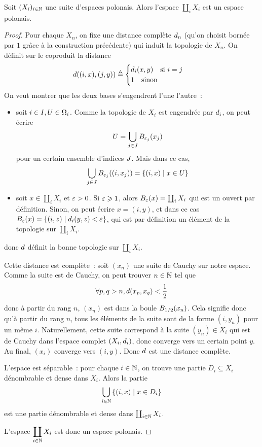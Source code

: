 \begin{proposition}
  Soit $(X_i)_{i\in \bN}$ une suite d'espaces polonais. Alors l'espace
  $\coprod_i X_i$ est un espace polonais.
\end{proposition}

\begin{proof}
  Pour chaque $X_n$, on fixe une distance complète $\vardis_n$ (qu'on choisit
  bornée par $1$ grâce à la construction précédente) qui induit la topologie de
  $X_n$. On définit sur le coproduit la distance
  \[\vardis((i,x),(j,y)) \defeq
  \begin{cases}
  \vardis_i(x,y) \quad \text{si } i = j\\
  1 \quad \text{sinon}
  \end{cases}\]
  On veut montrer que les deux bases s'engendrent l'une l'autre~:
  \begin{itemize}
  \item soit $i\in \indSet, \varOp \in \topo_i$. Comme la topologie de $X_i$
    est engendrée par $\vardis_i$, on peut écrire
    \[\varOp = \bigcup_{j \in \indSetB} \boule{x_j}{\vareps_j}\]
    pour un certain ensemble d'indices $\indSetB$. Mais dans ce cas,
    \[\bigcup_{j \in \indSetB}\boule{(i,x_j)}{\vareps_j} =
    \compr{(i,x)}{x \in \varOp}\]
  \item soit $x\in \coprod_i X_i$ et $\vareps > 0$. Si
    $\vareps \geq 1$, alors $\boule{x}{\vareps} = \coprod_i X_i$ qui est un
    ouvert par définition. Sinon, on peut écrire $x = (i,y)$, et dans ce cas
    $\boule{x}{\vareps} = \compr{(i,z)}{\vardis_i(y,z) < \vareps}$, qui est par
    définition un élément de la topologie sur $\coprod_i X_i$.
  \end{itemize}
  donc $\vardis$ définit la bonne topologie sur $\coprod_i X_i$.

  Cette distance est complète~: soit $(x_n)$ une suite de Cauchy sur notre
  espace. Comme la suite est de Cauchy, on peut trouver $n\in\bN$ tel que
  \[\forall p,q > n, \vardis(x_p,x_q) < \frac{1}{2}\]
  donc à partir du rang $n$, $(x_n)$ est dans la boule $\boule{x_n}{1/2}$.
  Cela signifie donc qu'à partir du rang $n$, tous les éléments de la suite
  sont de la forme $(i,y_n)$ pour un même $i$. Naturellement, cette suite
  correspond à la suite $(y_n) \in X_i$ qui est de Cauchy dans l'espace complet
  $(X_i,\vardis_i)$, donc converge vers un certain point $y$. Au final, $(x_i)$
  converge vers $(i,y)$. Donc $\vardis$ est une distance complète.

  L'espace est séparable~: pour chaque $i\in \bN$, on trouve une partie
  $D_i\subseteq X_i$ dénombrable et dense dans $X_i$. Alors la partie
  \[\bigcup_{i\in \bN}\compr{(i,x)}{x \in D_i}\]
  est une partie dénombrable et dense dans $\coprod_{i\in \bN} X_i$.

  L'espace $\displaystyle\coprod_{i\in \bN} X_i$ est donc un espace polonais.
\end{proof}

